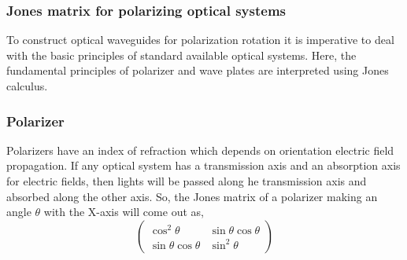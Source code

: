 \documentclass[../report.tex]{subfiles}
\begin{document}
			\subsubsection{Jones matrix for polarizing optical systems}
To construct optical waveguides for polarization rotation it is imperative to deal with the basic principles of standard available optical systems. Here, the fundamental principles of polarizer and wave plates are interpreted using Jones calculus.
		\subsubsection*{Polarizer}
Polarizers have an index of refraction which depends on orientation electric field propagation. If any optical system has a transmission axis and an absorption axis for electric fields, then lights will be passed along he transmission axis and absorbed along the other axis. So, the Jones matrix of a polarizer making an angle $\theta$ with the X-axis will come out as,
\begin{equation}\label{eq:jones_matrix_polarizer}
\left(\begin{matrix} 
\cos ^{2}\theta & \sin \theta \cos \theta \\ 
\sin \theta \cos \theta & \sin ^{2}\theta
\end{matrix} \right) 
\end{equation} 
\end{document}
